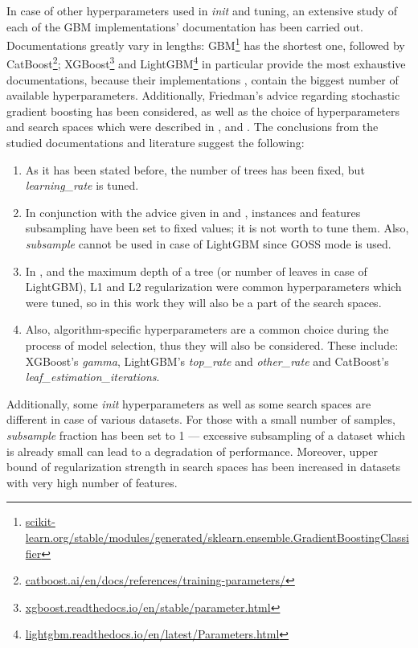 \documentclass[magisterska, english]{pwr_wmat_praca_dyplomowa}
\theoremstyle{plain}
\numberwithin{theorem}{chapter}
\theoremstyle{definition}
\numberwithin{theorem}{chapter}
\begin{document}
In case of other hyperparameters used in \emph{init} and tuning, an extensive study of each of the GBM implementations' documentation has been carried out. Documentations greatly vary in lengths: GBM\footnote{\url{scikit-learn.org/stable/modules/generated/sklearn.ensemble.GradientBoostingClassifier}} has the shortest one, followed by CatBoost\footnote{\url{catboost.ai/en/docs/references/training-parameters/}}; XGBoost\footnote{\url{xgboost.readthedocs.io/en/stable/parameter.html}} and LightGBM\footnote{\url{lightgbm.readthedocs.io/en/latest/Parameters.html}} in particular provide the most exhaustive documentations, because their implementations \cite{xgboost}, \cite{lightgbm} contain the biggest number of available hyperparameters. Additionally, Friedman's advice regarding stochastic gradient boosting \cite{friedman_stoch} has been considered, as well as the choice of hyperparameters and search spaces which were described in \cite{catboost}, \cite{comparative_analysis} and \cite{competitive_analysis}. The conclusions from the studied documentations and literature suggest the following:
\begin{enumerate}
    \item As it has been stated before, the number of trees has been fixed, but \emph{learning\_rate} is tuned.
    \item In conjunction with the advice given in \cite{friedman_stoch} and \cite{comparative_analysis}, instances and features subsampling have been set to fixed values; it is not worth to tune them. Also, \emph{subsample} cannot be used in case of LightGBM since GOSS mode is used.
    \item In \cite{catboost}, \cite{comparative_analysis} and \cite{competitive_analysis} the maximum depth of a tree (or number of leaves in case of LightGBM), L1 and L2 regularization were common hyperparameters which were tuned, so in this work they will also be a part of the search spaces.
    \item Also, algorithm-specific hyperparameters are a common choice during the process of model selection, thus they will also be considered. These include: XGBoost's \emph{gamma}, LightGBM's \emph{top\_rate} and \emph{other\_rate} and CatBoost's \emph{leaf\_estimation\_iterations}.
\end{enumerate}

Additionally, some \emph{init} hyperparameters as well as some search spaces are different in case of various datasets. For those with a small number of samples, \emph{subsample} fraction has been set to 1 --- excessive subsampling of a dataset which is already small can lead to a degradation of performance. Moreover, upper bound of regularization strength in search spaces has been increased in datasets with very high number of features.
\end{document}
